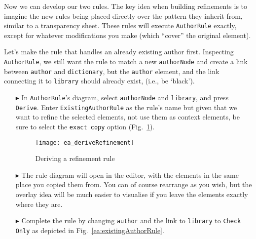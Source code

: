 \newpage

Now we can develop our two rules. The key idea when building refinements is to imagine the new rules being placed directly over the pattern they inherit
from, similar to a transparency sheet. These rules will execute \texttt{AuthorRule} exactly, except for whatever modifications you make (which ``cover'' the
original element).

Let's make the rule that handles an already existing author first. Inspecting \texttt{AuthorRule}, we still want the rule to match a new \texttt{authorNode}
and create a link between \texttt{author} and \texttt{dictionary}, but the \texttt{author} element, and the link connecting it to \texttt{library} should
already exist, (i.e., be `black').

\begin{itemize}

\subsubsection{ExistingAuthorRule} %

\item[$\blacktriangleright$] In \texttt{AuthorRule}'s diagram, select \texttt{authorNode} and \texttt{library}, and press \texttt{Derive}. Enter
\texttt{ExistingAuthorRule} as the rule's name but given that we want to refine the selected elements, not use them as context elements,
be sure to select the \texttt{exact copy} option (Fig.~\ref{ea:deriveRefinement}).

\begin{figure}[htbp]
\begin{center}
  \texttt{[image: ea\_deriveRefinement]}
  \caption{Deriving a refinement rule}
  \label{ea:deriveRefinement}
\end{center}
\end{figure}

\item[$\blacktriangleright$] The rule diagram will open in the editor, with the elements in the same place you copied them from. You can of course rearrange as
you wish, but the overlay idea will  be much easier to visualise if you leave the elements exactly where they are.

\item[$\blacktriangleright$] Complete the rule by changing \texttt{author} and the link to \texttt{library} to \texttt{Check Only} as depicted in
Fig.~\ref{ea:existingAuthorRule}.


\end{itemize}
